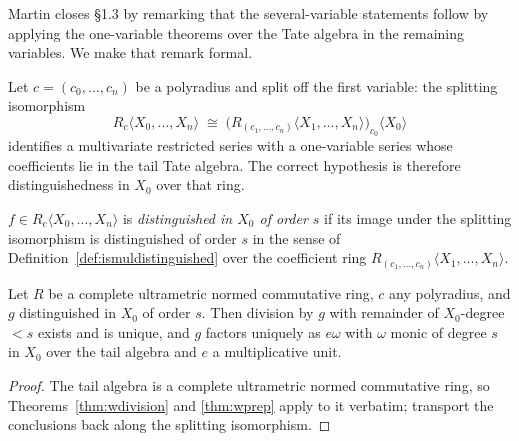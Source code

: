 Martin closes \S1.3 by remarking that the several-variable statements follow by applying the
one-variable theorems over the Tate algebra in the remaining variables.  We make that remark
formal.

Let $c = (c_0, \dots, c_n)$ be a polyradius and split off the first variable: the splitting
isomorphism
\[
  R_c \langle X_0, \dots, X_n \rangle \;\cong\; \bigl( R_{(c_1, \dots, c_n)} \langle X_1, \dots,
  X_n \rangle \bigr)_{c_0} \langle X_0 \rangle
\]
identifies a multivariate restricted series with a one-variable series whose coefficients lie in
the tail Tate algebra.  The correct hypothesis is therefore distinguishedness in $X_0$ over that
ring.

\begin{definition}
  \label{def:ismuldistinguishedx0}
  \leanok
  $f \in R_c\langle X_0, \dots, X_n\rangle$ is \emph{distinguished in $X_0$ of order $s$} if its
  image under the splitting isomorphism is distinguished of order $s$ in the sense of
  Definition~\ref{def:ismuldistinguished} over the coefficient ring $R_{(c_1, \dots, c_n)}\langle
  X_1, \dots, X_n\rangle$.
\end{definition}

\begin{theorem}
  \label{thm:mvweierstrass}
  \leanok
  Let $R$ be a complete ultrametric normed commutative ring, $c$ any polyradius, and $g$
  distinguished in $X_0$ of order $s$.  Then division by $g$ with remainder of $X_0$-degree $< s$
  exists and is unique, and $g$ factors uniquely as $e \omega$ with $\omega$ monic of degree $s$
  in $X_0$ over the tail algebra and $e$ a multiplicative unit.
\end{theorem}

\begin{proof}
  \leanok
  The tail algebra is a complete ultrametric normed commutative ring, so
  Theorems~\ref{thm:wdivision} and \ref{thm:wprep} apply to it verbatim; transport the
  conclusions back along the splitting isomorphism.
\end{proof}

